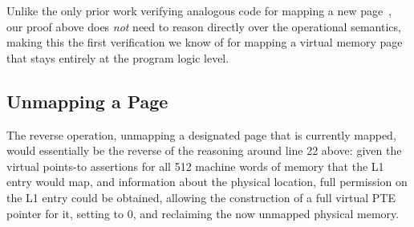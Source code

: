 Unlike the only prior work verifying analogous code for mapping a new page~\cite{kolanski08vstte,kolanski09tphols}, our proof above
does \emph{not} need to reason directly over the operational semantics,
making this the first verification we know of for mapping a virtual memory page that
stays entirely at the program logic level.
\ifPLDI
\else
\subsection{Unmapping a Page}
The reverse operation, unmapping a designated page that is currently mapped,
would essentially be the reverse of
the reasoning around line 22 above: given the virtual points-to assertions for all 512
machine words of memory that the L1 entry would map,
and information about the physical location, 
full permission on the L1 entry could be obtained, allowing the construction of a
full virtual PTE pointer for it, setting to 0, and reclaiming the now unmapped physical memory.
\fi



